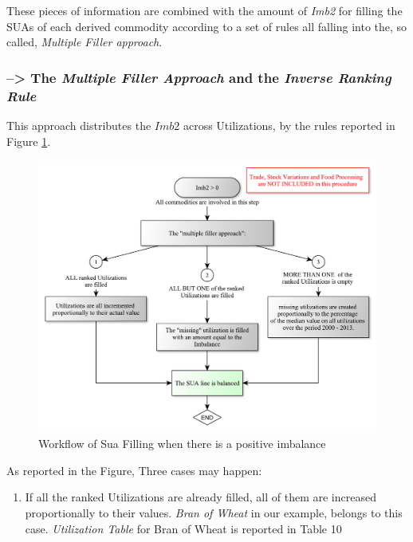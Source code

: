 \documentclass[]{article}
\providecommand{\tightlist}{%
  \setlength{\itemsep}{0pt}\setlength{\parskip}{0pt}}
\begin{document}
These pieces of information are combined with the amount of \emph{Imb2}
for filling the SUAs of each derived commodity according to a set of
rules all falling into the, so called, \emph{Multiple Filler approach}.

\subsubsection*{\texorpdfstring{--\textgreater{} The \emph{Multiple
Filler Approach} and the \emph{Inverse Ranking
Rule}}{--\textgreater{} The Multiple Filler Approach and the Inverse Ranking Rule}}\label{the-multiple-filler-approach-and-the-inverse-ranking-rule}

This approach distributes the \(Imb2\) across Utilizations, by the rules
reported in Figure \ref{fig:f7}.

\begin{figure}

{\centering \includegraphics{images/StandBal/07b_PositiveImbalance} 

}

\caption{\label{fig:f5}Workflow of Sua Filling when there is a positive imbalance}\label{fig:f7}
\end{figure}

As reported in the Figure, Three cases may happen:

\begin{enumerate}
\def\labelenumi{\arabic{enumi}.}
\tightlist
\item
  If all the ranked Utilizations are already filled, all of them are
  increased proportionally to their values. \emph{Bran of Wheat} in our
  example, belongs to this case. \emph{Utilization Table} for Bran of
  Wheat is reported in Table 10
\end{enumerate}
\end{document}
